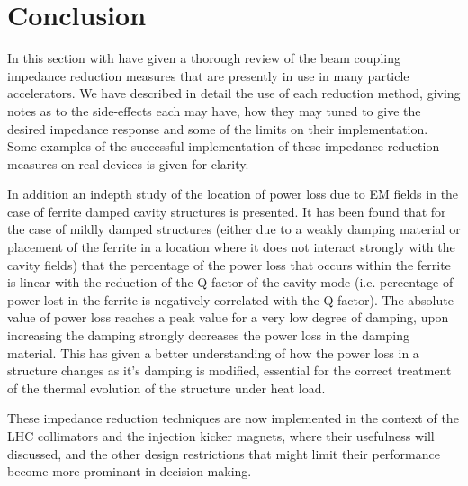 \section{Conclusion}

In this section with have given a thorough review of the beam coupling impedance reduction measures that are presently in use in many particle accelerators. We have described in detail the use of each reduction method, giving notes as to the side-effects each may have, how they may tuned to give the desired impedance response and some of the limits on their implementation. Some examples of the successful implementation of these impedance reduction measures on real devices is given for clarity.

In addition an indepth study of the location of power loss due to EM fields in the case of ferrite damped cavity structures is presented. It has been found that for the case of mildly damped structures (either due to a weakly damping material or placement of the ferrite in a location where it does not interact strongly with the cavity fields) that the percentage of the power loss that occurs within the ferrite is linear with the reduction of the Q-factor of the cavity mode (i.e. percentage of power lost in the ferrite is negatively correlated with the Q-factor). The absolute value of power loss reaches a peak value for a very low degree of damping, upon increasing the damping strongly decreases the power loss in the damping material. This has given a better understanding of how the power loss in a structure changes as it's damping is modified, essential for the correct treatment of the thermal evolution of the structure under heat load.

These impedance reduction techniques are now implemented in the context of the LHC collimators and the injection kicker magnets, where their usefulness will discussed, and the other design restrictions that might limit their performance become more prominant in decision making.